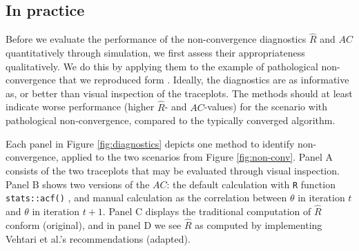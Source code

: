 \documentclass[Royal,times,sageh]{sagej}
\begin{document}
\hypertarget{in-practice}{%
\subsection{In practice}\label{in-practice}}

Before we evaluate the performance of the non-convergence diagnostics \(\widehat{R}\) and \(AC\) quantitatively through simulation, we first assess their appropriateness qualitatively. We do this by applying them to the example of pathological non-convergence that we reproduced form \citet{buur18}. Ideally, the diagnostics are as informative as, or better than visual inspection of the traceplots. The methods should at least indicate worse performance (higher \(\widehat{R}\)- and \(AC\)-values) for the scenario with pathological non-convergence, compared to the typically converged algorithm.

Each panel in Figure \ref{fig:diagnostics} depicts one method to identify non-convergence, applied to the two scenarios from Figure \ref{fig:non-conv}. Panel A consists of the two traceplots that may be evaluated through visual inspection. Panel B shows two versions of the \(AC\): the default calculation with \texttt{R} function \texttt{stats::acf()} \citep{R}, and manual calculation as the correlation between \(\theta\) in iteration \(t\) and \(\theta\) in iteration \(t+1\). Panel C displays the traditional computation of \(\widehat{R}\) conform \citet{gelm92} (original), and in panel D we see \(\widehat{R}\) as computed by implementing Vehtari et al.'s recommendations (adapted).
\end{document}
